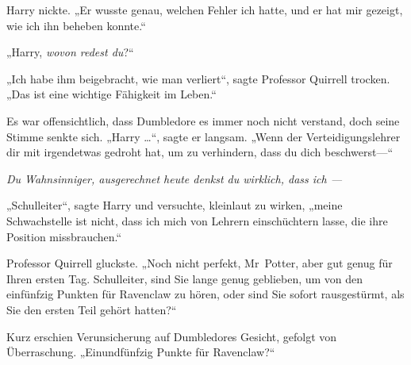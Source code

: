 Harry nickte. „Er wusste genau, welchen Fehler ich hatte, und er hat mir gezeigt, wie ich ihn beheben konnte.“

„Harry, \emph{wovon redest du}?“

„Ich habe ihm beigebracht, wie man verliert“, sagte Professor Quirrell trocken. „Das ist eine wichtige Fähigkeit im Leben.“

Es war offensichtlich, dass Dumbledore es immer noch nicht verstand, doch seine Stimme senkte sich. „Harry …“, sagte er langsam. „Wenn der Verteidigungslehrer dir mit irgendetwas gedroht hat, um zu verhindern, dass du dich beschwerst—“

\emph{Du Wahnsinniger, ausgerechnet heute denkst du wirklich, dass ich —}

„Schulleiter“, sagte Harry und versuchte, kleinlaut zu wirken, „meine Schwachstelle ist nicht, dass ich mich von Lehrern einschüchtern lasse, die ihre Position missbrauchen.“

Professor Quirrell gluckste. „Noch nicht perfekt, Mr~Potter, aber gut genug für Ihren ersten Tag. Schulleiter, sind Sie lange genug geblieben, um von den einfünfzig Punkten für Ravenclaw zu hören, oder sind Sie sofort rausgestürmt, als Sie den ersten Teil gehört hatten?“

Kurz erschien Verunsicherung auf Dumbledores Gesicht, gefolgt von Überraschung. „Einundfünfzig Punkte für Ravenclaw?“


